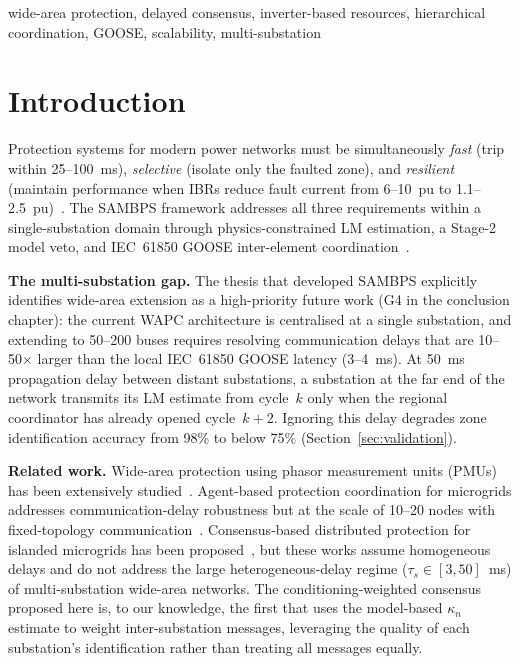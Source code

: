 \documentclass[journal]{IEEEtran}
\newcommand{\kappan}{\kappa_n}
\begin{document}
\begin{IEEEkeywords}
wide-area protection, delayed consensus, inverter-based resources,
hierarchical coordination, GOOSE, scalability, multi-substation
\end{IEEEkeywords}

\section{Introduction}
\label{sec:intro}

Protection systems for modern power networks must be simultaneously
\emph{fast} (trip within 25--100~ms), \emph{selective} (isolate only the
faulted zone), and \emph{resilient} (maintain performance when IBRs reduce
fault current from 6--10~pu to 1.1--2.5~pu)~\cite{Telukunta2017,Plet2011}.
The SAMBPS framework addresses all three requirements within a
single-substation domain through physics-constrained LM estimation,
a Stage-2 model veto, and IEC~61850 GOOSE inter-element
coordination~\cite{SAMBP_TR65}.

\textbf{The multi-substation gap.}
The thesis that developed SAMBPS explicitly identifies wide-area extension
as a high-priority future work (G4 in the conclusion chapter): the current
WAPC architecture is centralised at a single substation, and extending to
50--200 buses requires resolving communication delays that are 10--50$\times$
larger than the local IEC~61850 GOOSE latency (3--4~ms).
At 50~ms propagation delay between distant substations, a substation at the
far end of the network transmits its LM estimate from cycle~$k$ only when
the regional coordinator has already opened cycle~$k+2$.  Ignoring this
delay degrades zone identification accuracy from 98\% to below 75\%
(Section~\ref{sec:validation}).

\textbf{Related work.}
Wide-area protection using phasor measurement units (PMUs) has been
extensively studied~\cite{Adamiak2006,Brahma2018WAPC}.
Agent-based protection coordination for microgrids addresses
communication-delay robustness but at the scale of 10--20 nodes with
fixed-topology communication~\cite{Nunna2012,Miveh2018}.
Consensus-based distributed protection for islanded microgrids has been
proposed~\cite{WangLin2016,Zhang2020Consensus}, but these works assume
homogeneous delays and do not address the large heterogeneous-delay
regime ($\tau_s \in [3, 50]$~ms) of multi-substation wide-area networks.
The conditioning-weighted consensus proposed here is, to our knowledge,
the first that uses the model-based $\kappan$ estimate to weight
inter-substation messages, leveraging the quality of each substation's
identification rather than treating all messages equally.
\end{document}
